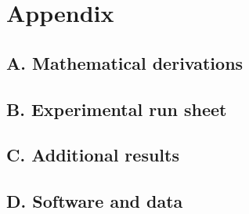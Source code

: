 \section*{Appendix}

\subsection*{A. Mathematical derivations}

\subsection*{B. Experimental run sheet}

\subsection*{C. Additional results}

\subsection*{D. Software and data}
